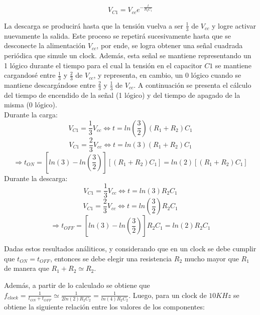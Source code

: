 \begin{equation}
V_{C1}=V_{cc}e^{-\frac{t}{R_{2}C_{1}}}
\end{equation}

La descarga se producirá hasta que la tensión vuelva a ser $\frac{1}{3}$
de $V_{cc}$ y logre activar nuevamente la salida. Este proceso se
repetirá sucesivamente hasta que se desconecte la alimentación $V_{cc}$,
por ende, se logra obtener una señal cuadrada periódica que simule
un clock. Además, esta señal se mantiene representando un 1
lógico durante el tiempo para el cual la tensión en el capacitor $C1$
se mantiene cargandosé entre $\frac{1}{3}$ y $\frac{2}{3}$ de $V_{cc}$,
y representa, en cambio, un 0 lógico cuando se mantiene descargándose
entre $\frac{2}{3}$ y $\frac{1}{3}$ de $V_{cc}$. A continuación
se presenta el cálculo del tiempo de encendido de la señal (1
lógico) y del tiempo de apagado de la misma (0 lógico).\\
\vspace{5mm}
Durante la carga:
\begin{equation}
V_{C1}=\frac{1}{3}V_{cc}\Longleftrightarrow t=ln(\frac{3}{2})(R_{1}+R_{2})C_{1}    
\end{equation}
\begin{equation}
V_{C1}=\frac{2}{3}V_{cc}\Longleftrightarrow t=ln(3)(R_{1}+R_{2})C_{1}
\end{equation}
\begin{equation}
\Rightarrow t_{ON}=[ln(3)-ln(\frac{3}{2})][(R_{1}+R_{2})C_{1}]=ln(2)[(R_{1}+R_{2})C_{1}]
\end{equation}
\vspace{5mm}
Durante la descarga:
\begin{equation}
V_{C1}=\frac{1}{3}V_{cc}\Longleftrightarrow t=ln(3)R_{2}C_{1}
\end{equation}
\begin{equation}
V_{C1}=\frac{2}{3}V_{cc}\Longleftrightarrow t=ln(\frac{3}{2})R_{2}C_{1}
\end{equation}
\begin{equation}
\Rightarrow t_{OFF}=[ln(3)-ln(\frac{3}{2})]R_{2}C_{1}=ln(2)R_{2}C_{1}
\end{equation}

\vspace{5mm}
Dadas estos resultados análiticos, y considerando que en un clock
se debe cumplir que $t_{ON}=t_{OFF}$, entonces se debe elegir una
resistencia $R_{2}$ mucho mayor que $R_{1}$ de manera que
$R_{1}+R_{2}\simeq R_{2}$.

Además, a partir de lo calculado se obtiene que $f_{clock}=\frac{1}{t_{ON}+t_{OFF}}\simeq\frac{1}{2ln(2)R_{2}C_{2}}=\frac{1}{ln(4)R_{2}C_{2}}$.
Luego, para un clock de $10KHz$ se obtiene la siguiente relación
entre los valores de los componentes:

